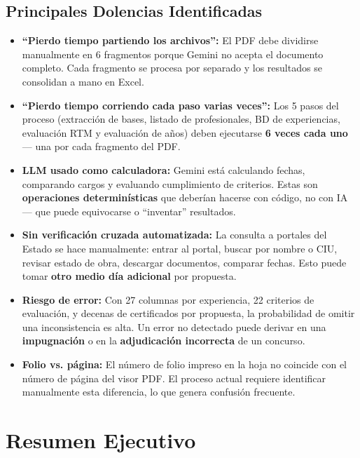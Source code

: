 \documentclass[11pt,a4paper]{article}
\begin{document}
\subsection{Principales Dolencias Identificadas}
\begin{itemize}[leftmargin=*]
    \item \textbf{``Pierdo tiempo partiendo los archivos'':} El PDF debe dividirse manualmente en 6 fragmentos porque Gemini no acepta el documento completo. Cada fragmento se procesa por separado y los resultados se consolidan a mano en Excel.
    
    \item \textbf{``Pierdo tiempo corriendo cada paso varias veces'':} Los 5 pasos del proceso (extracción de bases, listado de profesionales, BD de experiencias, evaluación RTM y evaluación de años) deben ejecutarse \textbf{6 veces cada uno} — una por cada fragmento del PDF.
    
    \item \textbf{LLM usado como calculadora:} Gemini está calculando fechas, comparando cargos y evaluando cumplimiento de criterios. Estas son \textbf{operaciones determinísticas} que deberían hacerse con código, no con IA — que puede equivocarse o ``inventar'' resultados.
    
    \item \textbf{Sin verificación cruzada automatizada:} La consulta a portales del Estado se hace manualmente: entrar al portal, buscar por nombre o CIU, revisar estado de obra, descargar documentos, comparar fechas. Esto puede tomar \textbf{otro medio día adicional} por propuesta.
    
    \item \textbf{Riesgo de error:} Con 27 columnas por experiencia, 22 criterios de evaluación, y decenas de certificados por propuesta, la probabilidad de omitir una inconsistencia es alta. Un error no detectado puede derivar en una \textbf{impugnación} o en la \textbf{adjudicación incorrecta} de un concurso.
    
    \item \textbf{Folio vs. página:} El número de folio impreso en la hoja no coincide con el número de página del visor PDF. El proceso actual requiere identificar manualmente esta diferencia, lo que genera confusión frecuente.
\end{itemize}

\section{Resumen Ejecutivo}
\end{document}
